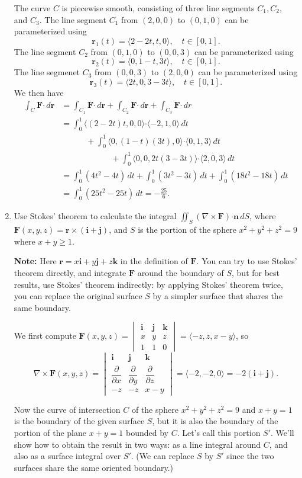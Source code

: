 \documentclass[letterpaper,12pt]{article}
\newcommand{\F}{\mathbf{F}}
\newcommand{\dotp}{\boldsymbol{\cdot}}
\renewcommand{\r}{\mathbf{r}}
\newcommand{\n}{\mathbf{n}}
\renewcommand{\i}{\mathbf{i}}
\renewcommand{\j}{\mathbf{j}}
\renewcommand{\k}{\mathbf{k}}
\newcommand{\bvm}{\begin{vmatrix}}
\newcommand{\evm}{\end{vmatrix}}
\newcommand{\pd}[2]{\dfrac{\partial #1}{\partial #2}}
\begin{document}
\begin{enumerate}
The curve $C$ is piecewise smooth, consisting of three line segments $C_1, C_2$, and $C_3$. The line segment $C_1$ from $(2,0,0)$ to $(0,1,0)$ can be parameterized using
\[
 \r_1(t) = \langle 2-2t, t, 0\rangle, \quad t\in [0,1].
\]
The line segment $C_2$ from $(0,1,0)$ to $(0,0,3)$ can be parameterized using
\[
 \r_2(t) = \langle 0, 1-t, 3t\rangle, \quad t\in [0,1].
\]
The line segmenet $C_3$ from $(0,0,3)$ to $(2,0,0)$ can be parameterized using
\[
 \r_3(t) = \langle 2t, 0, 3-3t\rangle, \quad t\in [0,1].
\]
We then have
\begin{align*}
 \int_C\F\dotp\,d\r & = \int_{C_1}\F\dotp\,d\r + \int_{C_2}\F\dotp\,d\r + \int_{C_3}\F\dotp\,dr\\
 & = \int_0^1\langle (2-2t)t,0,0\rangle\dotp\langle -2,1,0\rangle\,dt\\
&\quad\quad\quad + \int_0^1\langle 0, (1-t)(3t), 0\rangle \dotp\langle 0,1,3\rangle\,dt\\
 &\quad\quad\quad\quad\quad\quad+\int_0^1 \langle 0,0,2t(3-3t)\rangle\dotp \langle 2,0,3\rangle\,dt\\
 & = \int_0^1 (4t^2-4t)\,dt + \int_0^1 (3t^2-3t)\,dt + \int_0^1(18t^2-18t)\,dt\\
 & = \int_0^1 (25t^2-25t)\,dt = -\frac{25}{6}.
\end{align*}



\item Use Stokes' theorem to calculate the integral $\iint_S(\nabla\times \F)\dotp \n\,dS$, where $\F(x,y,z) = \r\times(\i+\j)$, and $S$ is the portion of the sphere $x^2+y^2+z^2=9$ where $x+y\geq 1$.

\textbf{Note:} Here $\r = x\i+y\j+z\k$ in the definition of $\F$. You can try to use Stokes' theorem directly, and integrate $\F$ around the boundary of $S$, but for best results, use Stokes' theorem indirectly: by applying Stokes' theorem twice, you can replace the original surface $S$ by a simpler surface that shares the same boundary.

\bigskip

We first compute $\F(x,y,z) = \bvm \i&\j&\k\\ x&y&z\\ 1&1&0\evm = \langle -z, z, x-y\rangle$, so
\[
 \nabla\times \F(x,y,z) = \bvm \i&\j&\k\\ \pd{}{x}&\pd{}{y}&\pd{}{z}\\-z&-z&x-y\evm = \langle -2, -2, 0\rangle = -2(\i+\j).
\]

Now the curve of intersection $C$ of the sphere $x^2+y^2+z^2=9$ and $x+y=1$ is the boundary of the given surface $S$, but it is also the boundary of the portion of the plane $x+y=1$ bounded by $C$. Let's call this portion $S'$. We'll show how to obtain the result in two ways: as a line integral around $C$, and also as a surface integral over $S'$. (We can replace $S$ by $S'$ since the two surfaces share the same oriented boundary.)


\end{enumerate}
\end{document}
